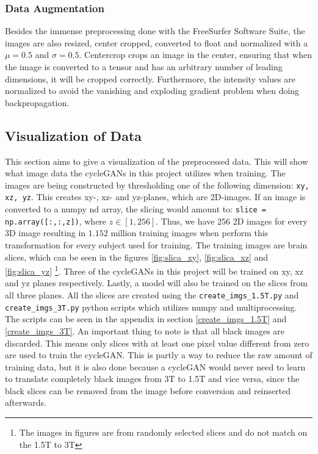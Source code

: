 \documentclass[12pt, fleqn, titlepage]{article}
\newcommand{\1}[1]{\mathds{1}\left[#1\right]}
\begin{document}


\subsubsection{Data Augmentation}

Besides the immense preprocessing done with the FreeSurfer Software Suite, the images are also resized, center cropped, converted to float and normalized with a $ \mu = 0.5 $ and $ \sigma = 0.5$. Centercrop crops an image in the center, ensuring that when the image is converted to a tensor and has an arbitrary number of leading dimensions, it will be cropped correctly. Furthermore, the intensity values are normalized to avoid the vanishing and exploding gradient problem when doing backpropagation.


\subsection{Visualization of Data}
This section aims to give a visualization of the preprocessed data. This will show what image data the cycleGANs in this project utilizes when training. The images are being constructed by thresholding one of the following dimension: \texttt{xy, xz, yz}. This creates xy-, xz- and yz-planes, which are 2D-images. If an image is converted to a numpy nd array, the slicing would amount to: \texttt{slice = np.array([:,:,z])}, where $ z \in [1,256] $. Thus, we have 256 2D images for every 3D image resulting in $ 1.152 $ million training images when perform this transformation for every subject used for training. The training images are brain slices, which can be seen in the figures \ref{fig:slica_xy}, \ref{fig:slica_xz} and \ref{fig:slica_yz} \footnote{The images in figures are from randomly selected slices and do not match on the 1.5T to 3T}. Three of the cycleGANs in this project will be trained on xy, xz and yz planes respectively. Lastly, a model will also be trained on the slices from all three planes. All the slices are created using the \texttt{create\_imgs\_1.5T.py} and \texttt{create\_imgs\_3T.py} python scripts which utilizes numpy and multiprocessing. The scripts can be seen in the appendix in section \ref{create_imgs_1.5T} and \ref{create_imgs_3T}.
An important thing to note is that all black images are discarded. This means only slices with at least one pixel value different from zero are used to train the cycleGAN. This is partly a way to reduce the raw amount of training data, but it is also done because a cycleGAN would never need to learn to translate completely black images from 3T to 1.5T and vice versa, since the black slices can be removed from the image before conversion and reinserted afterwards.
\end{document}
